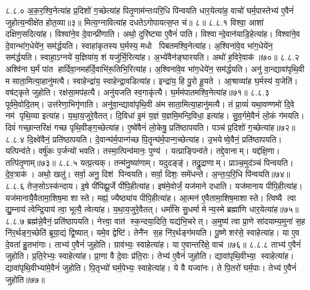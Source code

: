 ८.८.०
अ॒क॒र॒श्वि॒नेत्या॑ह प्र॒दिशो॑ ग॒च्छेत्या॑ह पितृ॒णाम॑न्तःपरि॒धि पि॑न्वयति धार॒येत्या॑ह॒ वाचो॑ घर्म॒पास्तेभ्य॑ ए॒वैनं॑ जुहोत्य॒न्वीक्षे॑त होत॒व्या॥३॥ मित्य॒ग्नावित्या॑ह दधतेऽगोपायत्स॒प्त च॑॥ ८॥
८.८.१
विश्वा॒ आशा॑ दक्षिण॒सदित्या॑ह। विश्वा॑ने॒व दे॒वान्प्री॑णाति। अथो॒ दुरि॑ष्ट्या ए॒वैनं॑ पाति। विश्वान्दे॒वान॑याडि॒हेत्या॑ह। विश्वा॑ने॒व दे॒वान्भा॑ग॒धेये॑न॒ सम॑र्द्धयति। स्वाहा॑कृतस्य घ॒र्मस्य॒ मधो पिबतमश्वि॒नेत्या॑ह। अ॒श्विना॑वे॒व भा॑ग॒धेये॑न॒ सम॑र्द्धयति। स्वाहा॒ऽग्नये॑ य॒ज्ञिया॑य॒ शं यजु॑र्भि॒रित्या॑ह। अ॒भ्ये॑वैन॑ङ्घारयति। अथो॑ ह॒विरे॒वाक॑॥७०॥
८.८.२
अश्वि॑ना घ॒र्मं पा॑त हार्दिवा॒नमह॑र्दि॒वाभि॑रू॒तिभि॒रित्या॑ह। अ॒श्विना॑वे॒व भा॑ग॒धेये॑न॒ सम॑र्द्धयति। अनु॑ वा॒न्द्यावा॑पृथि॒वी मसाता॒मित्या॒हानु॑मत्यै। स्वाहेन्द्रा॑य॒ स्वाहेन्द्रा॒वडित्या॑ह। इन्द्रा॑य॒ हि पु॒रो हू॒यते। आ॒श्राव्या॑ह घ॒र्मस्य॑ य॒जेति॑। वष॑ट्कृते जुहोति। रक्ष॑सा॒मप॑हत्यै। अनु॑यजति स्व॒गाकृ॑त्यै। घ॒र्मम॑पातमश्वि॒नेत्या॑ह॥७१॥
८.८.३
पूर्व॑मे॒वोदि॒तम्। उत्त॑रेणा॒भिगृ॑णाति। अनु॑वा॒न्द्यावा॑पृथि॒वी अ॑मसाता॒मित्या॒हानु॑मत्यै। तं प्रा॒व्यं॑ यथा॒वण्णमो॑ दि॒वे नम॑ पृथि॒व्या इत्या॑ह। य॒था॒य॒जुरे॒वैतत्। दि॒विधा॑ इ॒मं य॒ज्ञं य॒ज्ञमि॒मन्दि॒विधा॒ इत्या॑ह। सु॒व॒र्गमे॒वैनं॑ लो॒कं ग॑मयति। दिवं॑ गच्छा॒न्तरि॑क्षं गच्छ पृथि॒वीङ्ग॒च्छेत्या॑ह। ए॒ष्वे॑वैनं॑ लो॒केषु॒ प्रति॑ष्ठापयति। पञ्च॑ प्र॒दिशो॑ ग॒च्छेत्या॑ह॥७२॥
८.८.४
दि॒क्ष्वे॑वैनं॒ प्रति॑ष्ठापयति। दे॒वान्घ॑र्म॒पान्ग॑च्छ पि॒तॄन्घ॑र्म॒पान्ग॒च्छेत्या॑ह। उ॒भयेष्वे॒वैनं॒ प्रति॑ष्ठापयति। यत्पिन्व॑ते। वर्\mbox{}षु॑कः प॒र्जन्यो॑ भवति। तस्मा॒त्पिन्व॑मानः॒ पुण्य॑। यत्प्राङ्पिन्व॑ते। तद्दे॒वानाम्। यद्द॑क्षि॒णा। तत्पि॑तृ॒णाम्॥७३॥
८.८.५
यत्प्र॒त्यक्। तन्म॑नु॒ष्या॑णाम्। यदुदङ्ङ्॑। तद्रु॒द्राणाम्। प्राञ्च॒मुद॑ञ्चं पिन्वयति। दे॒व॒त्राक॑। अथो॒ खलु॑। सर्वा॒ अनु॒ दिश॑ पिन्वयति। सर्वा॒ दिशः॒ समे॑धन्ते। अ॒न्तः॒प॒रि॒धि पि॑न्वयति॥७४॥
८.८.६
तेज॒सोऽस्क॑न्दाय। इ॒षे पी॑पिह्यू॒र्जे पी॑पि॒हीत्या॑ह। इष॑मे॒वोर्जं॒ यज॑माने दधाति। यज॑मानाय पीपि॒हीत्या॑ह। यज॑मानायै॒वैतामा॒शिष॒मा शास्ते। मह्यं॒ ज्यैष्ठ्या॑य पीपि॒हीत्या॑ह। आ॒त्मन॑ ए॒वैतामा॒शिष॒माशास्ते। त्विष्यै त्वा द्यु॒म्नाय॑ त्वेन्द्रि॒याय॑ त्वा॒ भूत्यै॒ त्वेत्या॑ह। य॒था॒य॒जुरे॒वैतत्। धर्मा॑सि सु॒धर्मा मेन्य॒स्मे ब्रह्मा॑णि धार॒येत्या॑ह॥७५॥
८.८.७
ब्रह्म॑न्ने॒वैनं॒ प्रति॑ष्ठापयति। नेत्त्वा॒ वात॑ स्क॒न्दया॒दिति॒ यद्य॑भि॒चरेत्। अ॒मुष्य॑ त्वा प्रा॒णे सा॑दयाम्य॒मुना॑ स॒ह नि॑र॒र्थङ्ग॒च्छेति॑ ब्रूया॒द्यं द्वि॒ष्यात्। यमे॒व द्वेष्टि॑। तेनै॑न स॒ह नि॑र॒र्थङ्ग॑मयति। पू॒ष्णे शर॑से॒ स्वाहेत्या॑ह। या ए॒व दे॒वता॑ हु॒तभा॑गाः। ताभ्य॑ ए॒वैनं॑ जुहोति। ग्राव॑भ्यः॒ स्वाहेत्या॑ह। या ए॒वान्तरि॑क्षे॒ वाच॑॥७६॥
८.८.८
ताभ्य॑ ए॒वैनं॑ जुहोति। प्र॒ति॒रेभ्यः॒ स्वाहेत्या॑ह। प्रा॒णा वै दे॒वाः प्र॑ति॒राः। तेभ्य॑ ए॒वैनं॑ जुहोति। द्यावा॑पृथि॒वीभ्या॒ स्वाहेत्या॑ह। द्यावा॑पृथि॒वीभ्या॑मे॒वैनं॑ जुहोति। पि॒तृभ्यो॑ घर्म॒पेभ्यः॒ स्वाहेत्या॑ह। ये वै यज्वा॑नः। ते पि॒तरो॑ घर्म॒पाः। तेभ्य॑ ए॒वैनं॑ जुहोति॥७७॥
